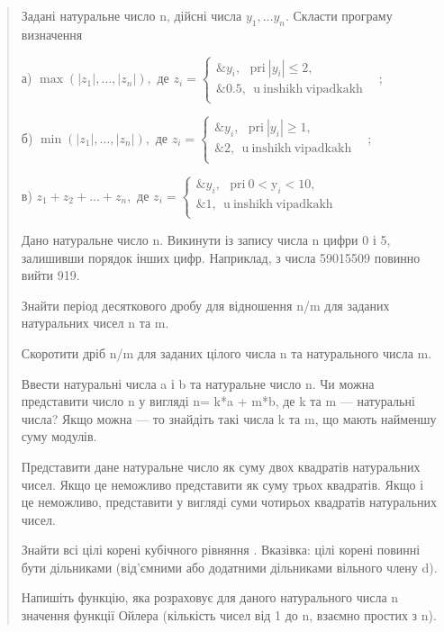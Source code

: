 \documentclass[]{article}
\begin{document}
\begin{quote}
Задані натуральне число n, дійсні числа \(y_{1},\ldots y_{n}.\) Скласти
програму визначення

а) \(\max(\left| z_{1} \right|,\ldots,\left| z_{n} \right|),\) де
\(z_{i} = \left\{ \begin{matrix}
\& y_{i},\mathrm{\ \ \ pri\ }\left| y_{i} \right| \leq 2, \\
\& 0.5,\mathrm{\ \ u\ inshikh\ vipadkakh\ \ \ } \\
\end{matrix} \right.\ \);

б) \(\min(\left| z_{1} \right|,\ldots,\left| z_{n} \right|),\) де
\(z_{i} = \left\{ \begin{matrix}
\& y_{i},\mathrm{\ \ \ pri\ }\left| y_{i} \right| \geq 1, \\
\& 2,\mathrm{\ \ u\ inshikh\ vipadkakh\ \ \ } \\
\end{matrix} \right.\ \);

в) \(z_{1} + z_{2} + \ldots + z_{n},\) де
\(z_{i} = \left\{ \begin{matrix}
\& y_{i},\mathrm{\ \ \ pri\ 0 <}\mathrm{y}_{i} < 10, \\
\& 1,\mathrm{\ \ u\ inshikh\ vipadkakh\ \ \ } \\
\end{matrix} \right.\ \)

Дано натуральне число n. Викинути із запису числа n цифри 0 і 5,
залишивши порядок інших цифр. Наприклад, з числа 59015509 повинно вийти
919.

Знайти період десяткового дробу для відношення n/m для заданих
натуральних чисел n та m.

Скоротити дріб n/m для заданих цілого числа n та натурального числа m.

Ввести натуральні числа a і b та натуральне число n. Чи можна
представити число n у вигляді n= k*a + m*b, де k та m --- натуральні
числа? Якщо можна --- то знайдіть такі числа k та m, що мають найменшу
суму модулів.

Представити дане натуральне число як суму двох квадратів натуральних
чисел. Якщо це неможливо представити як суму трьох квадратів. Якщо і це
неможливо, представити у вигляді суми чотирьох квадратів натуральних
чисел.

Знайти всі цілі корені кубічного рівняння . Вказівка: цілі корені
повинні бути дільниками (від'ємними або додатними дільниками вільного
члену d).

Напишіть функцію, яка розраховує для даного натурального числа n
значення функції Ойлера (кількість чисел від 1 до n, взаємно простих з
n).


\end{quote}
\end{document}

